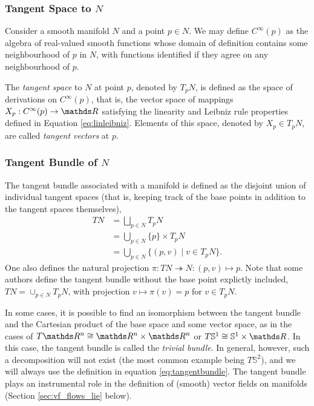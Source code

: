 \subsubsection{Tangent Space to $N$}

Consider a smooth manifold $N$ and a point $p \in N$. We may define $C^{\infty}(p)$ as the algebra of real-valued smooth functions whose domain of definition contains some neighbourhood of $p$ in $N$, with functions identified if they agree on any neighbourhood of $p$. %
\begin{defn}\label{def:tangentspace}
The \textit{tangent space} to $N$ at point $p$, denoted by $T_pN$, is defined as the space of derivations on $C^{\infty}(p)$, that is, the vector space of mappings $X_p: C^{\infty}(p)\rightarrow \R$ satisfying the linearity and Leibniz rule properties defined in Equation \ref{eq:linleibniz}. Elements of this space, denoted by $X_p\in T_pN$, are called \textit{tangent vectors} at $p$. 
\end{defn} 

\subsubsection{Tangent Bundle of $N$}

The tangent bundle associated with a manifold is defined as the disjoint union of individual tangent spaces (that is, keeping track of the base points in addition to the tangent spaces themselves), 
\begin{equation}\label{eq:tangentbundle}
\begin{aligned}
TN & = {} \bigsqcup_{p \in N} T_pN\\
 & = {} \bigcup_{p \in N} \{p\} \times T_pN\\
 & = {} \bigcup_{p \in N} \{(p, v) \mid v \in T_pN\}.
\end{aligned}
\end{equation}
One also defines the natural projection $\pi : TN \twoheadrightarrow N : (p, v) \mapsto p$. %
Note that some authors define the tangent bundle without the base point explictly included, $TN = \cup_{p\in N}T_pN$, with projection $v \mapsto \pi(v) = p$ for $v \in T_pN$. 

In some cases, it is possible to find an isomorphism between the tangent bundle and the Cartesian product of the base space and some vector space, as in the cases of $T\R^n \cong \R^n \times \R^n$ or $T\mathbb{S}^1 \cong \mathbb{S}^1 \times \R$. In this case, the tangent bundle is called the \textit{trivial bundle}. In general, however, such a decomposition will not exist (the most common example being $T\mathbb{S}^2$), and we will always use the definition in equation \ref{eq:tangentbundle}. The tangent bundle plays an instrumental role in the definition of (smooth) vector fields on manifolds (Section \ref{sec:vf_flows_lie} below). 

